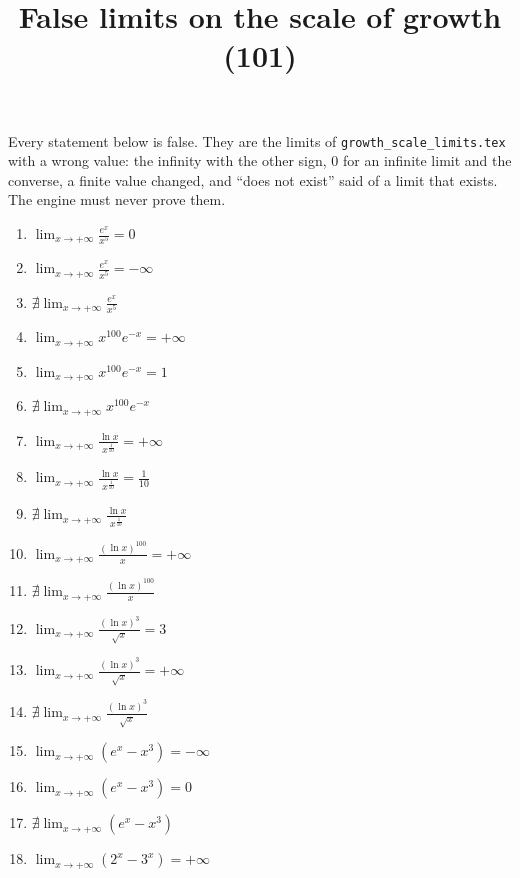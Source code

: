 \documentclass[11pt,a4paper]{article}
\title{False limits on the scale of growth (101)}
\author{}
\date{}
\begin{document}
\maketitle
Every statement below is false. They are the limits of \texttt{growth\_scale\_limits.tex} with a wrong value: the infinity with the other sign, $0$ for an infinite limit and the converse, a finite value changed, and ``does not exist'' said of a limit that exists. The engine must never prove them.

\begin{enumerate}
\item $\displaystyle \lim_{x \to +\infty} \frac{e^{x}}{x^{5}} = 0$
\item $\displaystyle \lim_{x \to +\infty} \frac{e^{x}}{x^{5}} = -\infty$
\item $\displaystyle \nexists \lim_{x \to +\infty} \frac{e^{x}}{x^{5}}$
\item $\displaystyle \lim_{x \to +\infty} x^{100} e^{-x} = +\infty$
\item $\displaystyle \lim_{x \to +\infty} x^{100} e^{-x} = 1$
\item $\displaystyle \nexists \lim_{x \to +\infty} x^{100} e^{-x}$
\item $\displaystyle \lim_{x \to +\infty} \frac{\ln x}{x^{\frac{1}{10}}} = +\infty$
\item $\displaystyle \lim_{x \to +\infty} \frac{\ln x}{x^{\frac{1}{10}}} = \frac{1}{10}$
\item $\displaystyle \nexists \lim_{x \to +\infty} \frac{\ln x}{x^{\frac{1}{10}}}$
\item $\displaystyle \lim_{x \to +\infty} \frac{(\ln x)^{100}}{x} = +\infty$
\item $\displaystyle \nexists \lim_{x \to +\infty} \frac{(\ln x)^{100}}{x}$
\item $\displaystyle \lim_{x \to +\infty} \frac{(\ln x)^{3}}{\sqrt{x}} = 3$
\item $\displaystyle \lim_{x \to +\infty} \frac{(\ln x)^{3}}{\sqrt{x}} = +\infty$
\item $\displaystyle \nexists \lim_{x \to +\infty} \frac{(\ln x)^{3}}{\sqrt{x}}$
\item $\displaystyle \lim_{x \to +\infty} \left(e^{x} - x^{3}\right) = -\infty$
\item $\displaystyle \lim_{x \to +\infty} \left(e^{x} - x^{3}\right) = 0$
\item $\displaystyle \nexists \lim_{x \to +\infty} \left(e^{x} - x^{3}\right)$
\item $\displaystyle \lim_{x \to +\infty} \left(2^{x} - 3^{x}\right) = +\infty$

\end{enumerate}
\end{document}
